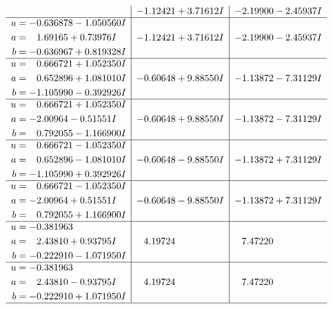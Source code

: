 \documentclass[1p]{elsarticle_modified}
\theoremstyle{definition}
\begin{document}
$$\begin{array}{c|c|c}
 & -1.12421 + 3.71612 I & -2.19900 - 2.45937 I \\ \hline\begin{aligned}
u &= -0.636878 - 1.050560 I \\
a &= \phantom{-}1.69165 + 0.73976 I \\
b &= -0.636967 + 0.819328 I\end{aligned}
 & -1.12421 + 3.71612 I & -2.19900 - 2.45937 I \\ \hline\begin{aligned}
u &= \phantom{-}0.666721 + 1.052350 I \\
a &= \phantom{-}0.652896 + 1.081010 I \\
b &= -1.105990 - 0.392926 I\end{aligned}
 & -0.60648 + 9.88550 I & -1.13872 - 7.31129 I \\ \hline\begin{aligned}
u &= \phantom{-}0.666721 + 1.052350 I \\
a &= -2.00964 - 0.51551 I \\
b &= \phantom{-}0.792055 - 1.166900 I\end{aligned}
 & -0.60648 + 9.88550 I & -1.13872 - 7.31129 I \\ \hline\begin{aligned}
u &= \phantom{-}0.666721 - 1.052350 I \\
a &= \phantom{-}0.652896 - 1.081010 I \\
b &= -1.105990 + 0.392926 I\end{aligned}
 & -0.60648 - 9.88550 I & -1.13872 + 7.31129 I \\ \hline\begin{aligned}
u &= \phantom{-}0.666721 - 1.052350 I \\
a &= -2.00964 + 0.51551 I \\
b &= \phantom{-}0.792055 + 1.166900 I\end{aligned}
 & -0.60648 - 9.88550 I & -1.13872 + 7.31129 I \\ \hline\begin{aligned}
u &= -0.381963\phantom{ +0.000000I} \\
a &= \phantom{-}2.43810 + 0.93795 I \\
b &= -0.222910 - 1.071950 I\end{aligned}
 & \phantom{-}4.19724\phantom{ +0.000000I} & \phantom{-}7.47220\phantom{ +0.000000I} \\ \hline\begin{aligned}
u &= -0.381963\phantom{ +0.000000I} \\
a &= \phantom{-}2.43810 - 0.93795 I \\
b &= -0.222910 + 1.071950 I\end{aligned}
 & \phantom{-}4.19724\phantom{ +0.000000I} & \phantom{-}7.47220\phantom{ +0.000000I}\\
 \hline 
 \end{array}$$\newpage\newpage\renewcommand{\arraystretch}{1}
\end{document}
